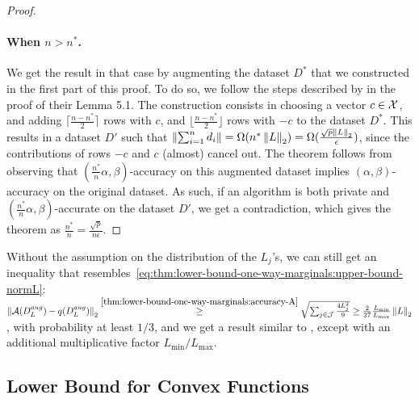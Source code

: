 \begin{proof}
  \paragraph{When \boldmath$n > n^*$.}
  We get the result in that case by augmenting the dataset $D^*$ that we
  constructed in the first part of this proof.
  To do so, we follow the steps described by \citet{bassily2014Private} in the
  proof of their Lemma 5.1.
  The construction consists in choosing a vector $c \in \mathcal X$, and adding
  $\lceil \frac{n-n^*}{2} \rceil$ rows with $c$, and
  $\lfloor \frac{n-n^*}{2} \rfloor$ rows with $-c$ to the dataset $D^*$.
  This results in a dataset $D'$ such that
  $\left \lVert \sum_{i=1}^n d_i \right \rVert = \Omega(n^* \left \lVert L \right \rVert_2) = \Omega(\frac{\sqrt{p} \left \lVert L \right \rVert_2}{\epsilon})$,
  since the contributions of rows $-c$ and $c$ (almost) cancel out.
  The theorem follows from observing that $(\frac{n^*}{n} \alpha,
    \beta)$-accuracy
  on this augmented dataset implies $(\alpha, \beta)$-accuracy on the original
  dataset.
  As such, if an algorithm is both private and $(\frac{n^*}{n} \alpha, \beta)$-accurate
  on the dataset $D'$, we get a contradiction, which gives the theorem as
  $\frac{n^*}{n} = \frac{\sqrt{p}}{n\epsilon}$.
\end{proof}

\begin{remark}
  \label{rmq:lower-bound-one-way-marginals-no-hyp-Lj}
  Without the assumption on the distribution of the $L_j$'s, we can still get
  an inequality that resembles~\eqref{eq:thm:lower-bound-one-way-marginals:upper-bound-normL}:
  $\left \lVert \mathcal A(D_L^{aug}) - q(D_L^{aug}) \right \rVert_2
    \overset{\eqref{thm:lower-bound-one-way-marginals:accuracy-A}}{\ge}
    \sqrt{\sum_{j \in \mathcal J} \frac{4L_j^2}{9}}
    \ge \frac{2}{27} \frac{L_{\min}}{L_{\max}} \left \lVert L \right \rVert_2$,
  with probability at least $1/3$, and we get a result similar to
  , except
  with an additional multiplicative factor $L_{\min}/L_{\max}$.
\end{remark}



\subsection{Lower Bound for Convex Functions}
\label{sec:convex-functions}

